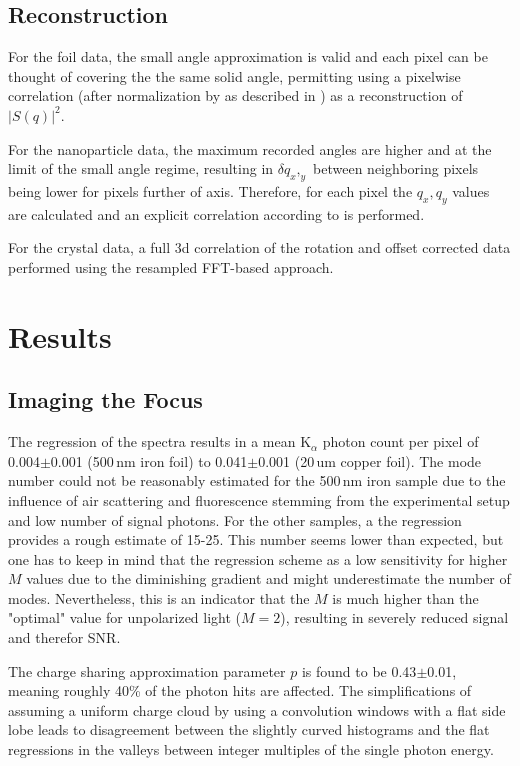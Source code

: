 \subsection{Reconstruction}
For the foil data, the small angle approximation is valid and each pixel can be thought of covering the the same solid angle, permitting using a pixelwise correlation (after normalization by as described in ) as a reconstruction of $|S(q)|^2$.

For the nanoparticle data, the maximum recorded angles are higher and at the limit of the small angle regime, resulting in $\delta q_x,_y$ between neighboring pixels being lower for pixels further of axis. Therefore, for each pixel the $q_x,q_y$ values are calculated and an explicit correlation according to  is performed.

For the crystal data, a full 3d correlation of the rotation and offset corrected data  performed using the resampled FFT-based approach.


\section{Results}
\subsection{Imaging the Focus}

The regression of the spectra results in a mean K$_{\alpha}$ photon count per pixel of 0.004$\pm$0.001 (500\,nm iron foil) to 0.041$\pm$0.001 (20\,um copper foil). The mode number could not be reasonably estimated for the 500\,nm iron sample due to the influence of air scattering and fluorescence stemming from the experimental setup and low number of signal photons. For the other samples, a the regression provides a rough estimate of 15-25. This number seems lower than expected, but one has to keep in mind that the regression scheme as a low sensitivity for higher $M$ values due to the diminishing gradient and might underestimate the number of modes. Nevertheless, this is an indicator that the $M$ is much higher than the "optimal" value for unpolarized light ($M=2$), resulting in severely reduced signal and therefor SNR.

The charge sharing approximation parameter $p$ is found to be 0.43$\pm$0.01, meaning roughly 40\% of the photon hits are affected. The simplifications of assuming a uniform charge cloud by using a convolution windows with a flat side lobe leads to disagreement between the slightly curved histograms and the flat regressions in the valleys between integer multiples of the single photon energy.

